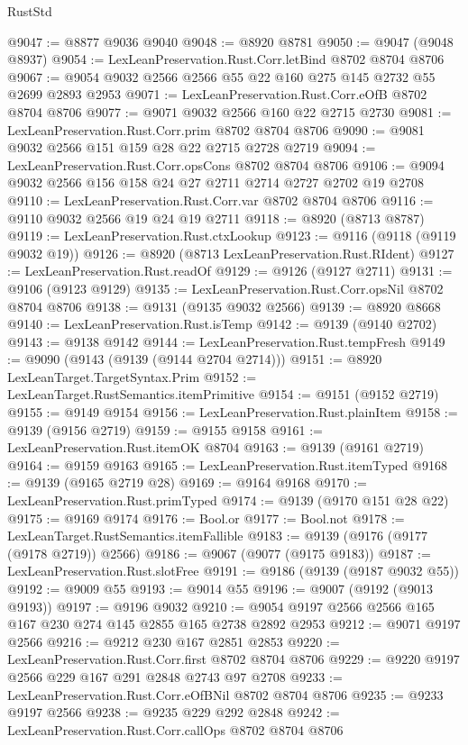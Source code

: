 \begin{lexlean}{RustStd}
\begin{coremodule}
@9047 := @8877 @9036 @9040
@9048 := @8920 @8781
@9050 := @9047 (@9048 @8937)
@9054 := LexLeanPreservation.Rust.Corr.letBind @8702 @8704 @8706
@9067 := @9054 @9032 @2566 @2566 @55 @22 @160 @275 @145 @2732 @55 @2699 @2893 @2953
@9071 := LexLeanPreservation.Rust.Corr.eOfB @8702 @8704 @8706
@9077 := @9071 @9032 @2566 @160 @22 @2715 @2730
@9081 := LexLeanPreservation.Rust.Corr.prim @8702 @8704 @8706
@9090 := @9081 @9032 @2566 @151 @159 @28 @22 @2715 @2728 @2719
@9094 := LexLeanPreservation.Rust.Corr.opsCons @8702 @8704 @8706
@9106 := @9094 @9032 @2566 @156 @158 @24 @27 @2711 @2714 @2727 @2702 @19 @2708
@9110 := LexLeanPreservation.Rust.Corr.var @8702 @8704 @8706
@9116 := @9110 @9032 @2566 @19 @24 @19 @2711
@9118 := @8920 (@8713 @8787)
@9119 := LexLeanPreservation.Rust.ctxLookup
@9123 := @9116 (@9118 (@9119 @9032 @19))
@9126 := @8920 (@8713 LexLeanPreservation.Rust.RIdent)
@9127 := LexLeanPreservation.Rust.readOf
@9129 := @9126 (@9127 @2711)
@9131 := @9106 (@9123 @9129)
@9135 := LexLeanPreservation.Rust.Corr.opsNil @8702 @8704 @8706
@9138 := @9131 (@9135 @9032 @2566)
@9139 := @8920 @8668
@9140 := LexLeanPreservation.Rust.isTemp
@9142 := @9139 (@9140 @2702)
@9143 := @9138 @9142
@9144 := LexLeanPreservation.Rust.tempFresh
@9149 := @9090 (@9143 (@9139 (@9144 @2704 @2714)))
@9151 := @8920 LexLeanTarget.TargetSyntax.Prim
@9152 := LexLeanTarget.RustSemantics.itemPrimitive
@9154 := @9151 (@9152 @2719)
@9155 := @9149 @9154
@9156 := LexLeanPreservation.Rust.plainItem
@9158 := @9139 (@9156 @2719)
@9159 := @9155 @9158
@9161 := LexLeanPreservation.Rust.itemOK @8704
@9163 := @9139 (@9161 @2719)
@9164 := @9159 @9163
@9165 := LexLeanPreservation.Rust.itemTyped
@9168 := @9139 (@9165 @2719 @28)
@9169 := @9164 @9168
@9170 := LexLeanPreservation.Rust.primTyped
@9174 := @9139 (@9170 @151 @28 @22)
@9175 := @9169 @9174
@9176 := Bool.or
@9177 := Bool.not
@9178 := LexLeanTarget.RustSemantics.itemFallible
@9183 := @9139 (@9176 (@9177 (@9178 @2719)) @2566)
@9186 := @9067 (@9077 (@9175 @9183))
@9187 := LexLeanPreservation.Rust.slotFree
@9191 := @9186 (@9139 (@9187 @9032 @55))
@9192 := @9009 @55
@9193 := @9014 @55
@9196 := @9007 (@9192 (@9013 @9193))
@9197 := @9196 @9032
@9210 := @9054 @9197 @2566 @2566 @165 @167 @230 @274 @145 @2855 @165 @2738 @2892 @2953
@9212 := @9071 @9197 @2566
@9216 := @9212 @230 @167 @2851 @2853
@9220 := LexLeanPreservation.Rust.Corr.first @8702 @8704 @8706
@9229 := @9220 @9197 @2566 @229 @167 @291 @2848 @2743 @97 @2708
@9233 := LexLeanPreservation.Rust.Corr.eOfBNil @8702 @8704 @8706
@9235 := @9233 @9197 @2566
@9238 := @9235 @229 @292 @2848
@9242 := LexLeanPreservation.Rust.Corr.callOps @8702 @8704 @8706

\end{coremodule}
\end{lexlean}
